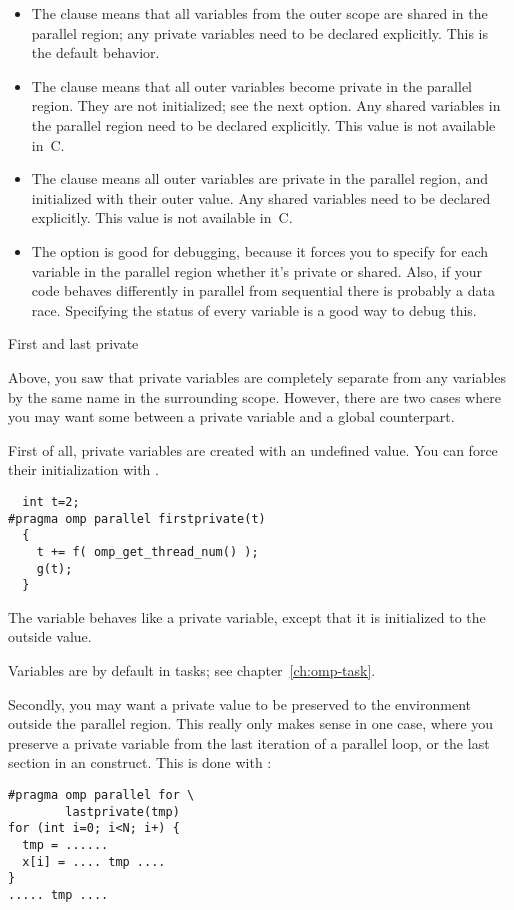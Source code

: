 \begin{itemize}
\item The  clause means that all
  variables from the outer scope are shared in the parallel region; any private variables
  need to be declared explicitly. This is the default behavior.
\item The  clause means that all
  outer variables become private in the parallel region. They are not
  initialized; see the next option. Any shared variables in the
  parallel region
  need to be declared explicitly. This value is not available in~C.
\item The  clause means all
  outer variables are private in the parallel region, and initialized
  with their outer value.  Any shared variables
  need to be declared explicitly. This value is not available in~C.
\item The  option is good for debugging, 
  because it forces you to specify for each variable in the parallel region
  whether it's private or shared. Also,
  if your code
behaves differently in parallel from sequential there is probably a data race.
Specifying the status of every variable is a good way to
debug this.
\end{itemize}

 {First and last private}

Above, you saw that private variables are completely separate from any
variables by the same name in the surrounding scope. However, there
are two cases where you may want some 
between a private variable and a global counterpart.

First of all, private variables are created with an undefined value.
You can force their initialization with .
\begin{lstlisting}
  int t=2;
#pragma omp parallel firstprivate(t)
  {
    t += f( omp_get_thread_num() );
    g(t);
  }
\end{lstlisting}
The variable  behaves like a private variable, except that it is
initialized to the outside value.

\begin{remark}
  Variables are  by default in tasks;
  see chapter~\ref{ch:omp-task}.
\end{remark}

Secondly, you may want a private value to be preserved to the
environment outside the parallel region. This really only makes sense
in one case, where you
preserve a private variable
from the last iteration of a parallel loop, or the last section in an
 construct.
This is done with :
\begin{lstlisting}
#pragma omp parallel for \
        lastprivate(tmp)
for (int i=0; i<N; i+) {
  tmp = ......
  x[i] = .... tmp ....
}
..... tmp ....
\end{lstlisting}

